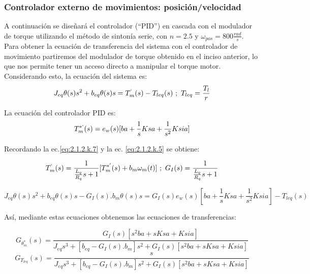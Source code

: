 \documentclass[10pt]{article}
\begin{document}
\subsubsection{Controlador externo de movimientos: posición/velocidad }
A continuación se diseñará el controlador (``PID'') en cascada con el modulador de torque utilizando el método de sintonía serie, con $n=2.5$ y $\omega_{pos}=800\frac{rad}{s}$.
Para obtener la ecuación de transferencia del sistema con el controlador de movimiento partiremos del modulador de torque obtenido en el inciso anterior, lo que nos permite tener un acceso directo a manipular el torque motor.
Considerando esto, la ecuación del sistema es:
		\begin{equation}
	J_{eq}\theta(s)s^{2}+b_{eq}\theta(s)s=T^{`}_{m}(s)-T_{leq}(s) \ ; \ T_{leq}= \frac{T_{l}}{r}
	\label{eq:2.1.2.q.1}
	\end{equation}
	
La ecuación del controlador PID es:
		\begin{equation}
	T^{*`}_{m}(s)=e_{w}(s)[ba+\frac{1}{s}Ksa + \frac{1}{s^{2}}Ksia]
	\label{eq:2.1.2.q.2}
	\end{equation}
	
Recordando la ec.\ref{eq:2.1.2.k.7} y la ec. \ref{eq:2.1.2.k.5} se obtiene:

	\begin{equation}
	T^{`}_{m}(s)=\frac{1}{\frac{L_{q}}{R_{q}}s+1}[T^{*'}_{m}(s)+b_{m}\omega_{m}(t)] \ ; \ G_{I}(s)=\frac{1}{\frac{L_{q}}{R_{q}}s+1}
	\label{eq:2.1.2.q.4}
	\end{equation}

	\begin{equation}
	J_{eq}\theta(s)s^{2}+b_{eq}\theta(s)s-G_{I}(s).b_{m}\theta(s)s=G_{I}(s)e_{w}(s)[ba+\frac{1}{s}Ksa + \frac{1}{s^{2}}Ksia]-T_{leq}(s)
	\label{eq:2.1.2.q.5}
	\end{equation}
	
Así, mediante estas ecuaciones obtenemos las ecuaciones de transferencias:
 
	\begin{equation}
	G_{\theta^{*}_{m}}(s)=\frac{G_{I}(s)[s^{2}ba+sKsa+Ksia]}{J_{eq}s^{3}+[b_{eq}-G_{I}(s).b_{m}]s^{2}+G_{I}(s)[s^{2}ba+sKsa+Ksia]}
	\label{eq:2.1.2.q.6}
	\end{equation}
 	\begin{equation}
	G_{T_{leq}}(s)=\frac{s}{J_{eq}s^{3}+[b_{eq}-G_{I}(s).b_{m}]s^{2}+G_{I}(s)[s^{2}ba+sKsa+Ksia]}
	\label{eq:2.1.2.q.6}
	\end{equation}
	
\end{document}
